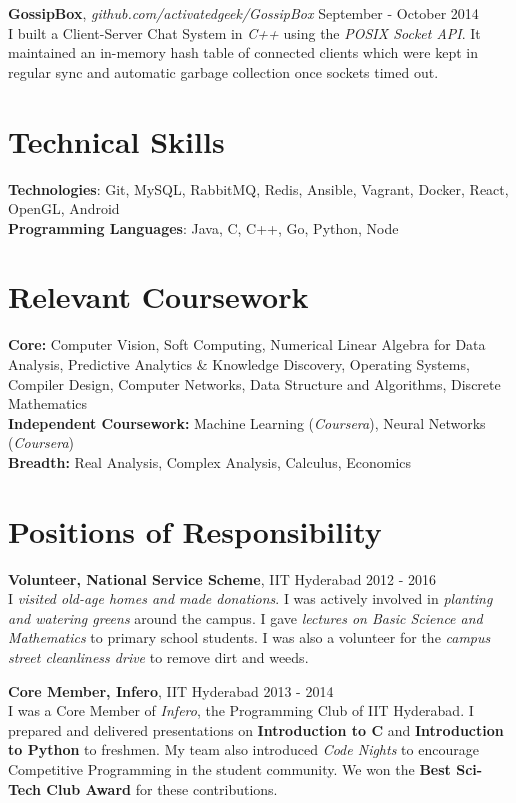 \documentclass[margin,line]{res}
\begin{document}
\begin{resume}
  \vspace*{-2.5mm}

  {\bf GossipBox}, {\it github.com/activatedgeek/GossipBox} \hfill September - October 2014 \\
    I built a Client-Server Chat System in {\it C++} using the {\it POSIX Socket API}. It maintained an in-memory hash table of connected clients which were kept in regular sync and automatic garbage collection once sockets timed out.

\section{\sc Technical Skills}

  {\bf Technologies}: Git, MySQL, RabbitMQ, Redis, Ansible, Vagrant, Docker, React, OpenGL, Android \\
  {\bf Programming Languages}: Java, C, C++, Go, Python, Node

\section{\sc Relevant Coursework}

  {\bf Core:} Computer Vision, Soft Computing, Numerical Linear Algebra for Data Analysis, Predictive Analytics \& Knowledge Discovery, Operating Systems, Compiler Design, Computer Networks, Data Structure and Algorithms, Discrete Mathematics \\
  {\bf Independent Coursework:} Machine Learning ({\it Coursera}), Neural Networks ({\it Coursera}) \\
  {\bf Breadth:} Real Analysis, Complex Analysis, Calculus, Economics

\section{\sc Positions of Responsibility}

  {\bf Volunteer, National Service Scheme}, IIT Hyderabad \hfill 2012 - 2016 \\
    I {\it visited old-age homes and made donations}. I was actively involved in {\it planting and watering greens} around the campus. I gave {\it lectures on Basic Science and Mathematics} to primary school students. I was also a volunteer for the {\it campus street cleanliness drive} to remove dirt and weeds.

  \vspace*{-2.5mm}

  {\bf Core Member, Infero}, IIT Hyderabad \hfill 2013 - 2014 \\
  	I was a Core Member of {\it Infero}, the Programming Club of IIT Hyderabad. I prepared and delivered presentations on {\bf Introduction to C} and {\bf Introduction to Python} to freshmen. My team also introduced {\it Code Nights} to encourage Competitive Programming in the student community. We won the {\bf Best Sci-Tech Club Award} for these contributions.


\end{resume}
\end{document}
